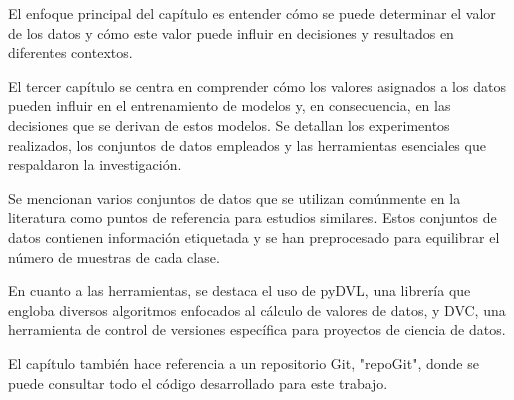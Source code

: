 El enfoque principal del capítulo es entender cómo se puede
determinar el valor de los datos y cómo este valor puede
influir en decisiones y resultados en diferentes contextos.

El tercer capítulo se centra en comprender cómo los valores
asignados a los datos pueden influir en el entrenamiento de
modelos y, en consecuencia, en las decisiones que se derivan
de estos modelos. Se detallan los experimentos realizados,
los conjuntos de datos empleados y las herramientas esenciales
que respaldaron la investigación.

Se mencionan varios conjuntos de datos que se utilizan
comúnmente en la literatura como puntos de referencia para
estudios similares. Estos conjuntos de datos contienen
información etiquetada y se han preprocesado para equilibrar
el número de muestras de cada clase.

En cuanto a las herramientas, se destaca el uso de pyDVL,
una librería que engloba diversos algoritmos enfocados al
cálculo de valores de datos, y DVC, una herramienta de control
de versiones específica para proyectos de ciencia de datos.

El capítulo también hace referencia a un repositorio Git,
"repoGit", donde se puede consultar todo el código desarrollado
para este trabajo.